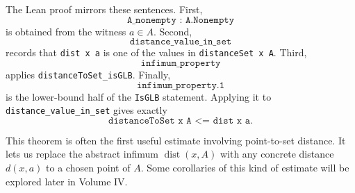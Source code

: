 \begin{remark*}
The Lean proof mirrors these sentences. First,
\[
  \texttt{A\_nonempty : A.Nonempty}
\]
is obtained from the witness \(a \in A\). Second,
\[
  \texttt{distance\_value\_in\_set}
\]
records that \texttt{dist x a} is one of the values in
\texttt{distanceSet x A}. Third,
\[
  \texttt{infimum\_property}
\]
applies \texttt{distanceToSet\_isGLB}. Finally,
\[
  \texttt{infimum\_property.1}
\]
is the lower-bound half of the \texttt{IsGLB} statement. Applying it to
\texttt{distance\_value\_in\_set} gives exactly
\[
  \texttt{distanceToSet x A <= dist x a}.
\]

This theorem is often the first useful estimate involving point-to-set
distance. It lets us replace the abstract infimum \(\operatorname{dist}(x,A)\)
with any concrete distance \(d(x,a)\) to a chosen point of \(A\). Some
corollaries of this kind of estimate will be explored later in Volume IV.
\end{remark*}

